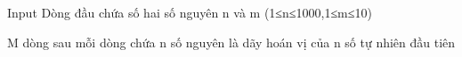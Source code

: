 Input
Dòng đầu chứa số hai số nguyên n và m (1≤n≤1000,1≤m≤10)  

   M dòng sau mỗi dòng chứa n số nguyên là dãy hoán vị của n số tự nhiên đầu tiên